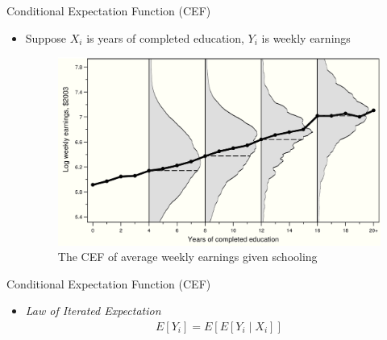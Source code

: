 \documentclass[aspectratio=1610,12pt,xcolor=dvipsnames]{beamer}
\begin{document}
\begin{frame}{Conditional Expectation Function (CEF)}
    \begin{itemize}
        \item Suppose $X_i$ is years of completed education, $Y_i$ is weekly earnings
        \begin{figure}
            \centering
            \includegraphics[width=0.7\linewidth]{Linear Regression/Figures/CEF_education.png}
            \caption{The CEF of average weekly earnings given schooling}
            \label{fig:CEF_education}
        \end{figure}
    \end{itemize}
\end{frame}

\begin{frame}{Conditional Expectation Function (CEF)}
    \begin{itemize}
        \item \textit{Law of Iterated Expectation}
        \begin{align*}
            E[Y_i] = E[E[Y_i \mid X_i]]
        \end{align*}
    \end{itemize}
\end{frame}
\end{document}
